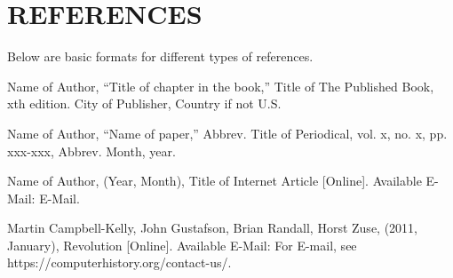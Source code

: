 \documentclass[letterpaper, 10 pt, conference]{IEEEconf}
\begin{document}
\section*{REFERENCES}

Below are basic formats for different types of references.

\begin{enumerate}[label={[\arabic*]}]
\item Name of Author, ``Title of chapter in the book,''
Title of The Published Book, xth edition. City of
Publisher, Country if not U.S.
\item Name of Author, “Name of paper,” Abbrev.
Title of Periodical, vol. x, no. x, pp. xxx-xxx,
Abbrev. Month, year.
\item Name of Author, (Year, Month),
Title of Internet Article [Online]. Available E-Mail:
E-Mail.
\item Martin Campbell-Kelly, John Gustafson, 
Brian Randall, Horst Zuse, (2011, January),
Revolution [Online]. Available E-Mail:
For E-mail, see https://computerhistory.org/contact-us/.
\end{enumerate}
\end{document}

